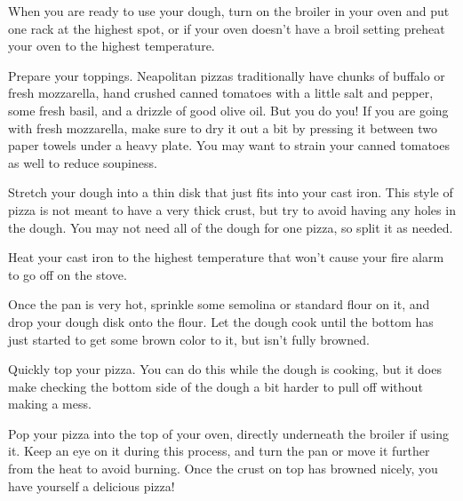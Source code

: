 \begin{recipe}
{		\step When you are ready to use your dough, turn on the broiler in your oven and put one rack at the highest spot, or if your oven doesn't have a broil setting preheat your oven to the highest temperature.

		\step Prepare your toppings. Neapolitan pizzas traditionally have chunks of buffalo or fresh mozzarella, hand crushed canned tomatoes with a little salt and pepper, some fresh basil, and a drizzle of good olive oil. But you do you! If you are going with fresh mozzarella, make sure to dry it out a bit by pressing it between two paper towels under a heavy plate. You may want to strain your canned tomatoes as well to reduce soupiness.

		\step Stretch your dough into a thin disk that just fits into your cast iron. This style of pizza is not meant to have a very thick crust, but try to avoid having any holes in the dough. You may not need all of the dough for one pizza, so split it as needed.

		\step Heat your cast iron to the highest temperature that won't cause your fire alarm to go off on the stove.

		\step Once the pan is very hot, sprinkle some semolina or standard flour on it, and drop your dough disk onto the flour. Let the dough cook until the bottom has just started to get some brown color to it, but isn't fully browned.

		\step Quickly top your pizza. You can do this while the dough is cooking, but it does make checking the bottom side of the dough a bit harder to pull off without making a mess.

		\step Pop your pizza into the top of your oven, directly underneath the broiler if using it. Keep an eye on it during this process, and turn the pan or move it further from the heat to avoid burning. Once the crust on top has browned nicely, you have yourself a delicious pizza!
	}

\end{recipe}